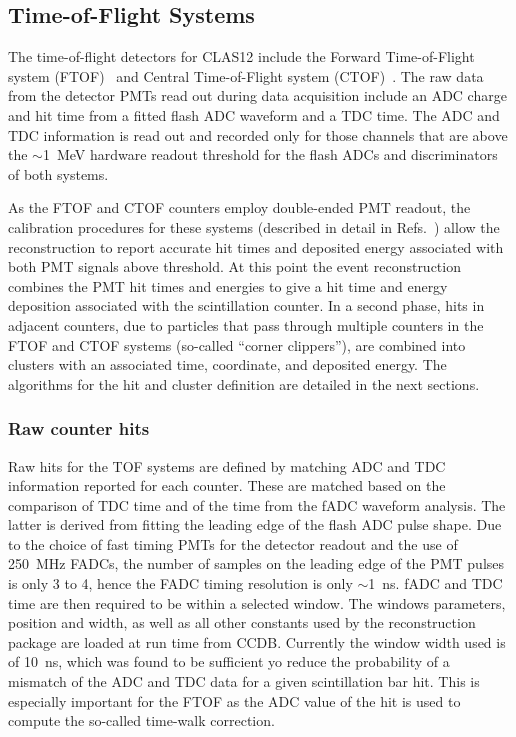 \subsection{Time-of-Flight Systems}
\label{tof-sys}

The time-of-flight detectors for CLAS12 include the Forward Time-of-Flight system (FTOF)~\cite{ftof-nim}
and Central Time-of-Flight system (CTOF)~\cite{ctof-nim}. The raw data from the detector PMTs read out
during data acquisition include an ADC charge and hit time from a fitted flash ADC waveform and a TDC time.
The ADC and TDC information is read out and recorded only for those channels that are above the $\sim$1~MeV
hardware readout threshold for the flash ADCs and discriminators of both systems. 

As the FTOF and CTOF counters employ double-ended PMT readout, the calibration procedures for these
systems (described in detail in Refs.~\cite{ftof-nim,ctof-nim}) allow the reconstruction to report accurate hit
times and deposited energy associated with both PMT signals above threshold. At this point the event
reconstruction combines the PMT hit times and energies to give a hit time and energy deposition associated with the
scintillation counter. In a second phase, hits in adjacent counters, due to particles that pass through multiple
counters in the FTOF and CTOF systems (so-called ``corner clippers''), are combined into clusters with an
associated time, coordinate, and deposited energy. The algorithms for the hit and cluster definition are detailed in the next sections.

\subsubsection{Raw counter hits}
Raw hits for the TOF systems are defined by matching ADC and TDC information reported for each counter. These are matched based on the comparison of TDC time and of the time from the fADC waveform analysis. The latter is derived from fitting the leading edge of the flash ADC pulse shape. Due to the choice of fast timing PMTs for the detector readout and the use of 250~MHz FADCs, the number of samples on the leading edge of the PMT pulses is only 3 to 4, hence the FADC timing resolution is only $\sim$1~ns. fADC and TDC time are then required to be within a selected window. The windows parameters, position and width, as well as all other constants used by the reconstruction package are loaded at run time from CCDB.
Currently the window width used is of 10~ns, which was found to be sufficient yo reduce the probability of a mismatch
of the ADC and TDC data for a given scintillation bar hit. This is especially important for the FTOF as the ADC
value of the hit is used to compute the so-called time-walk correction.

